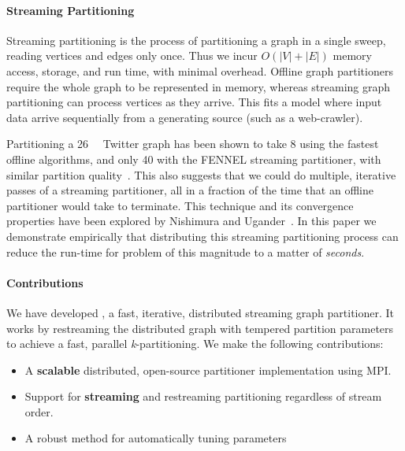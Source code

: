 \paragraph{Streaming Partitioning}
Streaming partitioning is the process of partitioning a graph in a single sweep, reading vertices and edges only once. Thus we incur $O(|V| + |E|)$ memory access, storage, and run time, with minimal overhead. Offline graph partitioners require the whole graph to be represented in memory, whereas streaming graph partitioning can process vertices as they arrive. This fits a model where input data arrive sequentially from a generating source (such as a web-crawler).

Partitioning a \SI{26}{\giga\byte} Twitter graph has been shown to take \SI[abbreviations=false]{8}{\hours} using the fastest offline algorithms, and only \SI{40}{\minutes} with the FENNEL streaming partitioner, with similar partition quality~\cite{tsourakakis2012fennel}. This also suggests that we could do multiple, iterative passes of a streaming partitioner, all in a fraction of the time that an offline partitioner would take to terminate. This technique and its convergence properties have been explored by Nishimura and Ugander~\cite{nishimura2013restream}. In this paper we demonstrate empirically that distributing this streaming partitioning process can reduce the run-time for problem of this magnitude to a matter of \emph{seconds}. 

\paragraph{Contributions}
We have developed \ourmethod, a fast, iterative, distributed streaming graph partitioner.
It works by restreaming the distributed graph with tempered partition parameters to achieve a fast, parallel \textit{k}-partitioning.
We make the following contributions:
\begin{itemize}
\item A \textbf{scalable} distributed, open-source partitioner implementation using MPI.
\item Support for \textbf{streaming} and restreaming partitioning regardless of stream order.
\item A robust method for automatically tuning \ourmethod parameters 
\end{itemize}



